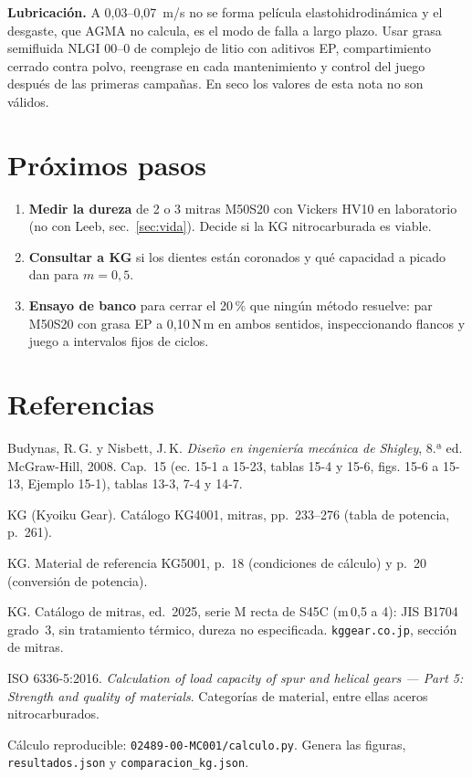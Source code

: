 \documentclass[11pt,a4paper]{article}
\newcommand{\Nm}{\,N\,m\xspace}
\begin{document}
\textbf{Lubricación.} A 0,03--0,07~m/s no se forma película elastohidrodinámica y el desgaste, que AGMA no calcula, es el modo
de falla a largo plazo. Usar grasa semifluida NLGI 00--0 de complejo de litio con aditivos EP, compartimiento cerrado contra polvo,
reengrase en cada mantenimiento y control del juego después de las primeras campañas. En seco los valores de esta nota no son válidos.

\section{Próximos pasos}
\begin{enumerate}[leftmargin=1.4em]
  \item \textbf{Medir la dureza} de 2 o 3 mitras M50S20 con Vickers HV10 en laboratorio (no con Leeb, sec.~\ref{sec:vida}). Decide si la KG nitrocarburada es viable.
  \item \textbf{Consultar a KG} si los dientes están coronados y qué capacidad a picado dan para $m=0{,}5$.
  \item \textbf{Ensayo de banco} para cerrar el 20\,\% que ningún método resuelve: par M50S20 con grasa EP a 0,10\Nm en ambos
        sentidos, inspeccionando flancos y juego a intervalos fijos de ciclos.
\end{enumerate}

\section{Referencias}
\begin{enumerate}[label={[\arabic*]}, leftmargin=2em]
  \item Budynas, R.\,G. y Nisbett, J.\,K. \emph{Diseño en ingeniería mecánica de Shigley}, 8.ª ed. McGraw-Hill, 2008.
        Cap.~15 (ec. 15-1 a 15-23, tablas 15-4 y 15-6, figs. 15-6 a 15-13, Ejemplo 15-1), tablas 13-3, 7-4 y 14-7.
  \item KG (Kyoiku Gear). Catálogo KG4001, mitras, pp.~233--276 (tabla de potencia, p.~261).
  \item KG. Material de referencia KG5001, p.~18 (condiciones de cálculo) y p.~20 (conversión de potencia).
  \item KG. Catálogo de mitras, ed.~2025, serie M recta de S45C (m\,0,5 a 4): JIS B1704 grado~3, sin tratamiento
        térmico, dureza no especificada. \texttt{kggear.co.jp}, sección de mitras.
  \item ISO 6336-5:2016. \emph{Calculation of load capacity of spur and helical gears --- Part 5: Strength and quality
        of materials}. Categorías de material, entre ellas aceros nitrocarburados.
\end{enumerate}

Cálculo reproducible: \texttt{02489-00-MC001/calculo.py}. Genera las figuras, \texttt{resultados.json} y \texttt{comparacion\_kg.json}.
\end{document}
